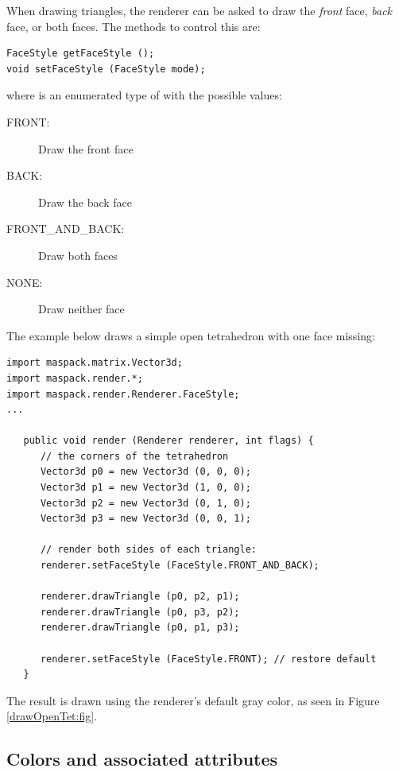 When drawing triangles, the renderer can be asked to
draw the {\it front} face, {\it back} face, or both faces. The
methods to control this are:
%
\begin{lstlisting}[]
FaceStyle getFaceStyle ();
void setFaceStyle (FaceStyle mode);
\end{lstlisting}
%
where 
is an enumerated type of 
with the possible values:

\begin{description}

\item[FRONT:]\mbox{} 

Draw the front face

\item[BACK:]\mbox{} 

Draw the back face

\item[FRONT\_AND\_BACK:]\mbox{} 

Draw both faces

\item[NONE:]\mbox{} 

Draw neither face

\end{description}
The example below draws a simple open tetrahedron with one face missing:
%
\begin{lstlisting}[]
import maspack.matrix.Vector3d;
import maspack.render.*;
import maspack.render.Renderer.FaceStyle;
...
   
   public void render (Renderer renderer, int flags) {
      // the corners of the tetrahedron
      Vector3d p0 = new Vector3d (0, 0, 0);
      Vector3d p1 = new Vector3d (1, 0, 0);
      Vector3d p2 = new Vector3d (0, 1, 0);
      Vector3d p3 = new Vector3d (0, 0, 1);
         
      // render both sides of each triangle:
      renderer.setFaceStyle (FaceStyle.FRONT_AND_BACK); 
      
      renderer.drawTriangle (p0, p2, p1);
      renderer.drawTriangle (p0, p3, p2);
      renderer.drawTriangle (p0, p1, p3);
      
      renderer.setFaceStyle (FaceStyle.FRONT); // restore default
   }
\end{lstlisting}
%
The result is drawn using the renderer's default gray color, as seen
in Figure \ref{drawOpenTet:fig}.

\subsection{Colors and associated attributes}
\label{colors:sec}

